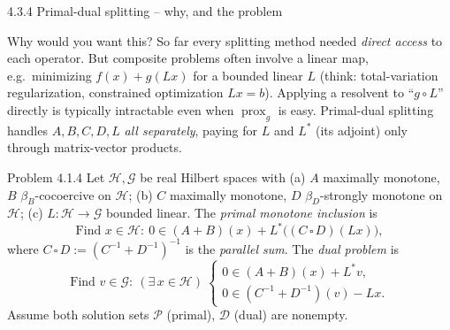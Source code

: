 \documentclass[aspectratio=169,10pt]{beamer}
\newcommand{\prox}{\operatorname{prox}}
\begin{document}
\begin{frame}[allowframebreaks]{4.3.4 Primal-dual splitting -- why, and the problem}
  \begin{block}{Why would you want this?}
    So far every splitting method needed \emph{direct access} to each operator. But composite problems often involve a linear map, e.g.\ minimizing $f(x)+g(Lx)$ for a bounded linear $L$ (think: total-variation regularization, constrained optimization $Lx=b$). Applying a resolvent to ``$g\circ L$'' directly is typically intractable even when $\prox_g$ is easy. Primal-dual splitting handles $A,B,C,D,L$ \emph{all separately}, paying for $L$ and $L^*$ (its adjoint) only through matrix-vector products.
  \end{block}
  \begin{block}{Problem 4.1.4}
    Let $\mathcal H,\mathcal G$ be real Hilbert spaces with (a) $A$ maximally monotone, $B$ $\beta_B$-cocoercive on $\mathcal H$; (b) $C$ maximally monotone, $D$ $\beta_D$-strongly monotone on $\mathcal H$; (c) $L:\mathcal H\to\mathcal G$ bounded linear. The \emph{primal monotone inclusion} is
    \begin{equation*}
      \text{Find } x\in\mathcal H:\ 0\in(A+B)(x)+L^*\big((C\,\square\,D)(Lx)\big), \tag{4.16}
    \end{equation*}
    where $C\,\square\,D:=(C^{-1}+D^{-1})^{-1}$ is the \emph{parallel sum}. The \emph{dual problem} is
    \begin{equation*}
      \text{Find } v\in\mathcal G:\ (\exists\, x\in\mathcal H)\ \begin{cases} 0\in(A+B)(x)+L^*v, \\ 0\in(C^{-1}+D^{-1})(v)-Lx. \end{cases} \tag{4.17}
    \end{equation*}
    Assume both solution sets $\mathcal P$ (primal), $\mathcal D$ (dual) are nonempty.
  \end{block}

  \framebreak


\end{frame}
\end{document}
